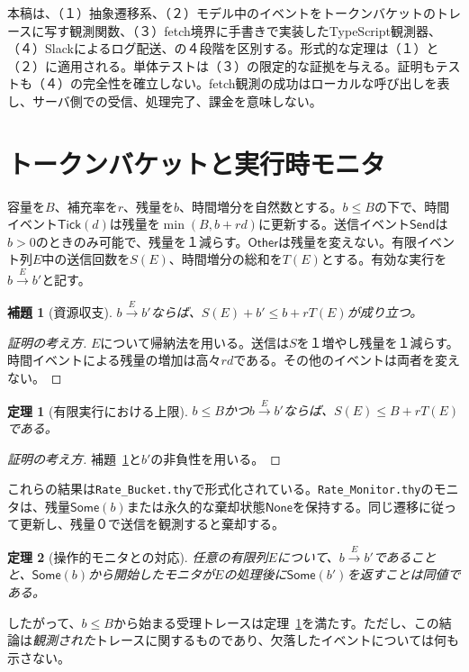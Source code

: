 \documentclass[10pt,twocolumn]{ltjsarticle}
\newtheorem{theorem}{定理}
\newtheorem{lemma}{補題}
\newcommand{\send}{\mathsf{Send}}
\newcommand{\other}{\mathsf{Other}}
\newcommand{\tick}{\mathsf{Tick}}
\begin{document}
本稿は、（１）抽象遷移系、（２）モデル中のイベントをトークンバケットのトレースに写す観測関数、（３）fetch境界に手書きで実装したTypeScript観測器、（４）Slackによるログ配送、の４段階を区別する。形式的な定理は（１）と（２）に適用される。単体テストは（３）の限定的な証拠を与える。証明もテストも（４）の完全性を確立しない。fetch観測の成功はローカルな呼び出しを表し、サーバ側での受信、処理完了、課金を意味しない。

\section{トークンバケットと実行時モニタ}
容量を$B$、補充率を$r$、残量を$b$、時間増分を自然数とする。$b\leq B$の下で、時間イベント$\tick(d)$は残量を$\min(B,b+rd)$に更新する。送信イベント$\send$は$b>0$のときのみ可能で、残量を１減らす。$\other$は残量を変えない。有限イベント列$E$中の送信回数を$S(E)$、時間増分の総和を$T(E)$とする。有効な実行を$b\xrightarrow{E}b'$と記す。

\begin{lemma}[資源収支]\label{lem:account}
$b\xrightarrow{E}b'$ならば、$S(E)+b'\leq b+rT(E)$が成り立つ。
\end{lemma}
\begin{proof}[証明の考え方]
$E$について帰納法を用いる。送信は$S$を１増やし残量を１減らす。時間イベントによる残量の増加は高々$rd$である。その他のイベントは両者を変えない。
\end{proof}
\begin{theorem}[有限実行における上限]\label{thm:bucket}
$b\leq B$かつ$b\xrightarrow{E}b'$ならば、$S(E)\leq B+rT(E)$である。
\end{theorem}
\begin{proof}[証明の考え方]
補題~\ref{lem:account}と$b'$の非負性を用いる。
\end{proof}
これらの結果は\texttt{Rate\_Bucket.thy}で形式化されている。\texttt{Rate\_Monitor.thy}のモニタは、残量$\mathsf{Some}(b)$または永久的な棄却状態$\mathsf{None}$を保持する。同じ遷移に従って更新し、残量０で送信を観測すると棄却する。
\begin{theorem}[操作的モニタとの対応]\label{thm:monitor}
任意の有限列$E$について、$b\xrightarrow{E}b'$であることと、$\mathsf{Some}(b)$から開始したモニタが$E$の処理後に$\mathsf{Some}(b')$を返すことは同値である。
\end{theorem}
したがって、$b\leq B$から始まる受理トレースは定理~\ref{thm:bucket}を満たす。ただし、この結論は\emph{観測された}トレースに関するものであり、欠落したイベントについては何も示さない。
\end{document}
